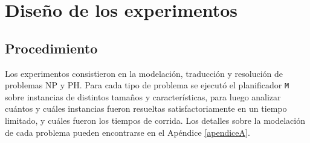 %
%

\section{Diseño de los experimentos}

\subsection{Procedimiento}

Los experimentos consistieron en la modelación, traducción y resolución
de problemas NP y PH. Para cada tipo de problema se ejecutó el planificador
\texttt{M} sobre instancias de
distintos tamaños y características, para luego analizar cuántos y cuáles
instancias fueron resueltas satisfactoriamente en un tiempo limitado, y cuáles
fueron los tiempos de corrida.
Los detalles sobre la modelación de cada problema pueden encontrarse en el
Apéndice \ref{apendiceA}.

